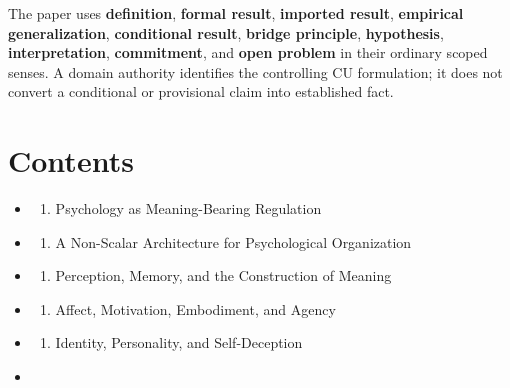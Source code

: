 \documentclass[
  11pt,
]{article}
\providecommand{\tightlist}{%
  \setlength{\itemsep}{0pt}\setlength{\parskip}{0pt}}
\begin{document}
The paper uses \textbf{definition}, \textbf{formal result},
\textbf{imported result}, \textbf{empirical generalization},
\textbf{conditional result}, \textbf{bridge principle},
\textbf{hypothesis}, \textbf{interpretation}, \textbf{commitment}, and
\textbf{open problem} in their ordinary scoped senses. A domain
authority identifies the controlling CU formulation; it does not convert
a conditional or provisional claim into established fact.

\section{Contents}\label{contents}

\begin{itemize}
\tightlist
\item
  \begin{enumerate}
  \def\labelenumi{\arabic{enumi}.}
  \tightlist
  \item
    Psychology as Meaning-Bearing Regulation
  \end{enumerate}
\item
  \begin{enumerate}
  \def\labelenumi{\arabic{enumi}.}
  \setcounter{enumi}{1}
  \tightlist
  \item
    A Non-Scalar Architecture for Psychological Organization
  \end{enumerate}
\item
  \begin{enumerate}
  \def\labelenumi{\arabic{enumi}.}
  \setcounter{enumi}{2}
  \tightlist
  \item
    Perception, Memory, and the Construction of Meaning
  \end{enumerate}
\item
  \begin{enumerate}
  \def\labelenumi{\arabic{enumi}.}
  \setcounter{enumi}{3}
  \tightlist
  \item
    Affect, Motivation, Embodiment, and Agency
  \end{enumerate}
\item
  \begin{enumerate}
  \def\labelenumi{\arabic{enumi}.}
  \setcounter{enumi}{4}
  \tightlist
  \item
    Identity, Personality, and Self-Deception
  \end{enumerate}
\item
  \begin{enumerate}
  \def\labelenumi{\arabic{enumi}.}
  \setcounter{enumi}{5}

\end{enumerate}
\end{itemize}
\end{document}

